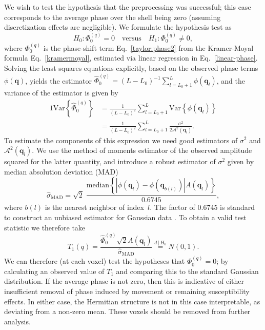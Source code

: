 \documentclass[authoryear,preprint,12pt]{elsarticle}
\newcommand{\var}{\text{Var}}
\newcommand{\q}{\mathbf{q}}
\newcommand{\cA}{\mathcal{A}}
\newcommand{\wh}[1]{\widehat{#1}}
\begin{document}
We wish to test the hypothesis that the preprocessing was successful;
this case corresponds to the average phase over the shell being zero
(assuming discretization effects are negligible).  We formulate the
hypothesis test as
\begin{equation}
  H_0: \Phi_0^{(q)} = 0 \quad \text{versus} \quad H_1: \Phi_0^{(q)}
  \neq 0,
\end{equation}
where $\Phi_0^{(q)}$ is the phase-shift term Eq.~\eqref{taylor:phase2}
from the Kramer-Moyal formula Eq.~\eqref{kramermoyal}, estimated via
linear regression in Eq.~\eqref{linear-phase}.  Solving the least
squares equations explicitly, based on the observed phase terms
$\phi(\q)$, yields the estimator
$\wh{\Phi}_0^{(q)}=(L-L_0)^{-1}\sum_{l=L_0+1}^{L}\phi(\q_l)$, and the
variance of the estimator is given by
\begin{alignat}{1}
  \var\left\{\wh{\Phi}_0^{(q)}\right\} &= \frac{1}{(L-L_0)^2}
  \sum_{l=L_0+1}^{L} \var\left\{\phi(\q_l)\right\}\\
  &= \frac{1}{(L-L_0)^2} \sum_{l=L_0+1}^{L}
  \frac{\sigma^2}{2\cA^2(\q_l)}.
\end{alignat}
To estimate the components of this expression we need good estimators
of $\sigma^2$ and $\cA^2(\q_l)$.  We use the method of moments
estimator of the observed amplitude squared for the latter quantity,
and introduce a robust estimator of $\sigma^2$ given by median
absolution deviation (MAD)
\begin{equation}
  \hat{\sigma}_{\text{MAD}} = \sqrt{2} \; \frac{{\text{median}} 
    \left\{\left|\phi(\q_l) - \phi(\q_{b(l)})\right|
    A(\q_l)\right\}}{0.6745},
\end{equation}
where $b(l)$ is the nearest neighbor of index~$l$.  The factor of
0.6745 is standard to construct an unbiased estimator for Gaussian
data \citep{Hoaglin}.  To obtain a valid test statistic we therefore
take
\begin{equation}
  T_1(q) = \frac{\wh{\Phi}_0^{(q)}\sqrt{2}A(\q_l)}
  {\hat{\sigma}_{\text{MAD}}} \overset{d\,|\,H_0}{=} N(0,1).
\end{equation}
We can therefore (at each voxel) test the hypotheses that
$\Phi_0^{(q)}=0$; by calculating an observed value of $T_1$ and
comparing this to the standard Gaussian distribution.  If the average
phase is not zero, then this is indicative of either insufficient
removal of phase induced by movement or remaining susceptibility
effects.  In either case, the Hermitian structure is not in this case
interpretable, as deviating from a non-zero mean.  These voxels should
be removed from further analysis.
\end{document}
